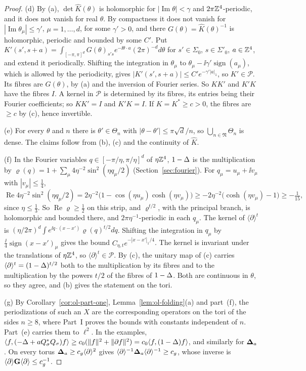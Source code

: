 \begin{proof}
(d) By (a), $\det\hat K(\theta)$ is holomorphic for $|\operatorname{Im}\theta|<\gamma$ and $2\pi\mathbb Z^4$-periodic, and it does not vanish for real $\theta$. By compactness it does not vanish for $|\operatorname{Im}\theta_\mu|\le\gamma'$, $\mu=1,\dots,d$, for some $\gamma'>0$, and there $G(\theta)=\hat K(\theta)^{-1}$ is holomorphic, periodic and bounded by some $C'$. Put $K'(s',s+a)=\int_{[-\pi,\pi]^d}G(\theta)_{s's}e^{-\ii\theta\cdot a}(2\pi)^{-d}d\theta$ for $s'\in\Sigma_0$, $s\in\Sigma'_0$, $a\in\mathbb Z^4$, and extend it periodically. Shifting the integration in $\theta_\mu$ to $\theta_\mu-\ii\gamma'\operatorname{sign}(a_\mu)$, which is allowed by the periodicity, gives $|K'(s',s+a)|\le C'e^{-\gamma'|a|_1}$, so $K'\in\mathscr P$. Its fibres are $G(\theta)$, by (a) and the inversion of Fourier series. So $KK'$ and $K'K$ have the fibres $I$. A kernel in $\mathscr P$ is determined by its fibres, its entries being their Fourier coefficients; so $KK'=I$ and $K'K=I$. If $K=K^*\ge c>0$, the fibres are $\ge c$ by (c), hence invertible.

(e) For every $\theta$ and $n$ there is $\theta'\in\Theta_n$ with $|\theta-\theta'|\le\pi\sqrt d/n$, so $\bigcup_{n\in\mathfrak N}\Theta_n$ is dense. The claims follow from (b), (c) and the continuity of $\hat K$.

(f) In the Fourier variables $q\in[-\pi/\eta,\pi/\eta]^d$ of $\eta\mathbb Z^4$, $1-\Delta$ is the multiplication by $\varrho(q)=1+\sum_\mu4\eta^{-2}\sin^2(\eta q_\mu/2)$ (Section~\ref{sec:fourier}). For $q_\mu=u_\mu+\ii v_\mu$ with $|v_\mu|\le\frac14$,
\[
\operatorname{Re}4\eta^{-2}\sin^2(\eta q_\mu/2)=2\eta^{-2}\big(1-\cos(\eta u_\mu)\cosh(\eta v_\mu)\big)\ge-2\eta^{-2}\big(\cosh(\eta v_\mu)-1\big)\ge-\tfrac1{15},
\]
since $\eta\le\frac13$. So $\operatorname{Re}\varrho\ge\frac12$ on this strip, and $\varrho^{t/2}$, with the principal branch, is holomorphic and bounded there, and $2\pi\eta^{-1}$-periodic in each $q_\mu$. The kernel of $\langle\partial\rangle^t$ is $(\eta/2\pi)^d\int e^{\ii q\cdot(x-x')}\varrho(q)^{t/2}dq$. Shifting the integration in $q_\mu$ by $\frac\ii4\operatorname{sign}(x-x')_\mu$ gives the bound $C_{\eta,t}e^{-|x-x'|_1/4}$. The kernel is invariant under the translations of $\eta\mathbb Z^4$, so $\langle\partial\rangle^t\in\mathscr P$. By (c), the unitary map of (c) carries $\langle\partial\rangle^t=(1-\Delta)^{t/2}$ both to the multiplication by its fibres and to the multiplication by the powers $t/2$ of the fibres of $1-\Delta$. Both are continuous in $\theta$, so they agree, and (b) gives the statement on the tori.

(g) By Corollary~\ref{cor:ol-part-one}, Lemma~\ref{lem:ol-folding}(a) and part~(f), the periodizations of such an $X$ are the corresponding operators on the tori of the sides $n\ge8$, where Part~I proves the bounds with constants independent of $n$. Part~(e) carries them to $\ell^2$. In the examples, $\langle f,(-\Delta+aQ_\sigma^*Q_\sigma)f\rangle\ge c_0(\|f\|^2+\|\partial f\|^2)=c_0\langle f,(1-\Delta)f\rangle$, and similarly for $\boldsymbol{\Delta}_a$. On every torus $\boldsymbol{\Delta}_a\ge c_g\langle\partial\rangle^2$ gives $\langle\partial\rangle^{-1}\boldsymbol{\Delta}_a\langle\partial\rangle^{-1}\ge c_g$, whose inverse is $\langle\partial\rangle\mathbf G\langle\partial\rangle\le c_g^{-1}$.
\end{proof}

